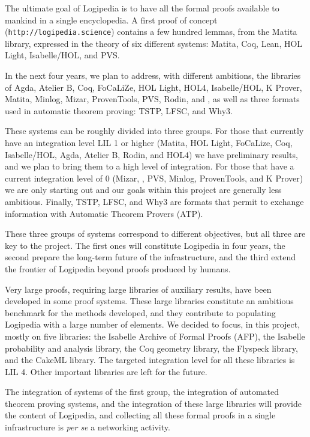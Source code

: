 The ultimate goal of Logipedia is to have all the formal proofs
available to mankind in a single encyclopedia.  A first proof of
concept ({\tt http://logipedia.science}) contains a few hundred
lemmas, from the Matita library, expressed in the theory of six
different systems: Matita, Coq, Lean, HOL Light, Isabelle/HOL, and
PVS.

In the next four years, we plan to address, with different ambitions,
the libraries of Agda, Atelier B, Coq, FoCaLiZe, HOL Light, HOL4,
Isabelle/HOL, K Prover, Matita, Minlog, Mizar, ProvenTools, PVS,
Rodin, and \tlaplus, as well as three formats used in automatic
theorem proving: TSTP, LFSC, and Why3. 

These systems can be roughly divided into three groups.  For those
that currently have an integration level LIL 1 or higher (Matita, HOL
Light, FoCaLize, Coq, Isabelle/HOL, Agda, Atelier B, Rodin, and HOL4)
we have preliminary results, and we plan to bring them to a high level
of integration.  For those that have a current integration level of 0
(Mizar, \tlaplus, PVS, Minlog, ProvenTools, and K Prover) we are only
starting out and our goals within this project are generally less
ambitious. Finally, TSTP, LFSC, and Why3 are formats that permit
to exchange information with Automatic Theorem Provers (ATP).

These three groups of systems correspond to different
objectives, but all three are key to the project. The first ones will
constitute Logipedia in four years, the second prepare the
long-term future of the infrastructure, and the third extend the
frontier of Logipedia beyond proofs produced by humans.

Very large proofs, requiring large libraries of auxiliary results,
have been developed in some proof systems. These large libraries
constitute an ambitious benchmark for the methods developed, and they
contribute to populating Logipedia with a large number of elements.
We decided to focus, in this project, mostly on five libraries: the
Isabelle Archive of Formal Proofs (AFP), the Isabelle probability and
analysis library, the Coq geometry library, the Flyspeck library, and
the CakeML library. The targeted integration level for all these
libraries is LIL 4. Other important libraries are left for the future.

The integration of systems of the first group, the integration of
automated theorem proving systems, and the integration of these large
libraries will provide the content of Logipedia, and collecting all
these formal proofs in a single infrastructure is {\em per se} a
networking activity.

